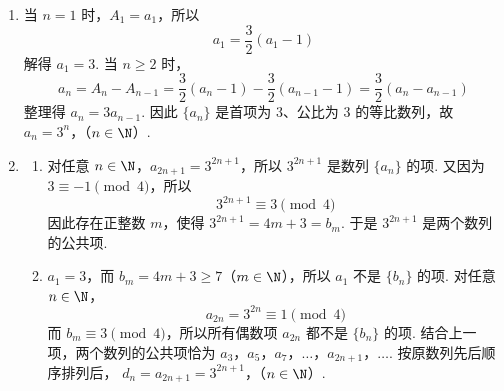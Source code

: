 \documentclass[UTF8,a4paper,oneside,11pt]{ctexbook}
\begin{document}
\begin{solution}
\begin{enumerate}
\item 当 \(n=1\) 时，\(A_1=a_1\)，所以
\[
a_1=\frac{3}{2}(a_1-1)
\]
解得 \(a_1=3\). 当 \(n\geq2\) 时，
\[
a_n=A_n-A_{n-1}
=\frac{3}{2}(a_n-1)-\frac{3}{2}(a_{n-1}-1)
=\frac{3}{2}(a_n-a_{n-1})
\]
整理得 \(a_n=3a_{n-1}\). 因此 \(\{a_n\}\) 是首项为 \(3\)、公比为 \(3\) 的等比数列，故
\(a_n=3^n\)，（\(n\in\N\)）.

\item
\begin{enumerate}
\item 对任意 \(n\in\N\)，\(a_{2n+1}=3^{2n+1}\)，所以 \(3^{2n+1}\) 是数列 \(\{a_n\}\) 的项. 又因为 \(3\equiv-1\pmod4\)，所以
\[
3^{2n+1}\equiv3\pmod4
\]
因此存在正整数 \(m\)，使得 \(3^{2n+1}=4m+3=b_m\). 于是 \(3^{2n+1}\) 是两个数列的公共项.

\item \(a_1=3\)，而 \(b_m=4m+3\geq7\)（\(m\in\N\)），所以 \(a_1\) 不是 \(\{b_n\}\) 的项. 对任意 \(n\in\N\)，
\[
a_{2n}=3^{2n}\equiv1\pmod4
\]
而 \(b_m\equiv3\pmod4\)，所以所有偶数项 \(a_{2n}\) 都不是 \(\{b_n\}\) 的项. 结合上一项，两个数列的公共项恰为
\(a_3\)，\(a_5\)，\(a_7\)，\(\ldots\)，\(a_{2n+1}\)，\(\ldots\).
按原数列先后顺序排列后，
\(d_n=a_{2n+1}=3^{2n+1}\)，（\(n\in\N\)）.
\end{enumerate}
\end{enumerate}
\end{solution}

\end{document}
